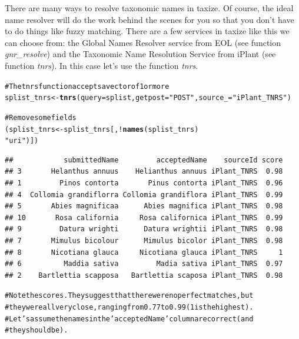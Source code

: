 \documentclass[10pt]{article}\usepackage[]{graphicx}\usepackage[]{color}
\makeatletter
\newcommand{\hlfunctioncall}[1]{\textcolor[rgb]{0.501960784313725,0,0.329411764705882}{\textbf{#1}}}%
\newcommand{\hlstring}[1]{\textcolor[rgb]{0.6,0.6,1}{#1}}%
\newcommand{\hlcomment}[1]{\textcolor[rgb]{0.180392156862745,0.6,0.341176470588235}{#1}}%
\newenvironment{kframe}{%
 \def\at@end@of@kframe{}%
 \ifinner\ifhmode%
  \def\at@end@of@kframe{\end{minipage}}%
  \begin{minipage}{\columnwidth}%
 \fi\fi%
 \def\FrameCommand##1{\hskip\@totalleftmargin \hskip-\fboxsep
 \colorbox{shadecolor}{##1}\hskip-\fboxsep
     \hskip-\linewidth \hskip-\@totalleftmargin \hskip\columnwidth}%
 \MakeFramed {\advance\hsize-\width
   \@totalleftmargin\z@ \linewidth\hsize
   \@setminipage}}%
 {\par\unskip\endMakeFramed%
 \at@end@of@kframe}
\newenvironment{knitrout}{}{} %
\makeatother
\begin{document}
There are many ways to resolve taxonomic names in taxize. Of course, the ideal name resolver will do the work behind the scenes for you so that you don't have to do things like fuzzy matching. There are a few services in taxize like this we can choose from: the Global Names Resolver service from EOL (see function \emph{gnr\_resolve}) and the Taxonomic Name Resolution Service from iPlant (see function \emph{tnrs}). In this case let's use the function \emph{tnrs}. 

\begin{knitrout}
\color{fgcolor}\begin{kframe}
\begin{alltt}
\hlcomment{# The tnrs function accepts a vector of 1 or more}
splist_tnrs <- \hlfunctioncall{tnrs}(query = splist, getpost = \hlstring{"POST"}, source_ = \hlstring{"iPlant_TNRS"})
\end{alltt}


{\ttfamily\noindent\itshape\color{messagecolor}{\#\# Calling http://taxosaurus.org/retrieve/7763b460ecdf76eee52f78e9569e7c91}}\begin{alltt}

\hlcomment{# Remove some fields}
(splist_tnrs <- splist_tnrs[, !\hlfunctioncall{names}(splist_tnrs) %
    \hlstring{"uri"})])
\end{alltt}
\begin{verbatim}
##            submittedName         acceptedName    sourceId score
## 3       Helanthus annuus    Helianthus annuus iPlant_TNRS  0.98
## 1         Pinos contorta       Pinus contorta iPlant_TNRS  0.96
## 4  Collomia grandiflorra Collomia grandiflora iPlant_TNRS  0.99
## 5       Abies magnificaa      Abies magnifica iPlant_TNRS  0.98
## 10       Rosa california     Rosa californica iPlant_TNRS  0.99
## 9         Datura wrighti      Datura wrightii iPlant_TNRS  0.98
## 7       Mimulus bicolour      Mimulus bicolor iPlant_TNRS  0.98
## 8       Nicotiana glauca     Nicotiana glauca iPlant_TNRS     1
## 6          Maddia sativa         Madia sativa iPlant_TNRS  0.97
## 2    Bartlettia scapposa   Bartlettia scaposa iPlant_TNRS  0.98
\end{verbatim}
\begin{alltt}

\hlcomment{# Note the scores. They suggest that there were no perfect matches, but}
\hlcomment{# they were all very close, ranging from 0.77 to 0.99 (1 is the highest).}
\hlcomment{# Let's assume the names in the 'acceptedName' column are correct (and}
\hlcomment{# they should be).}


\end{alltt}
\end{kframe}
\end{knitrout}
\end{document}
